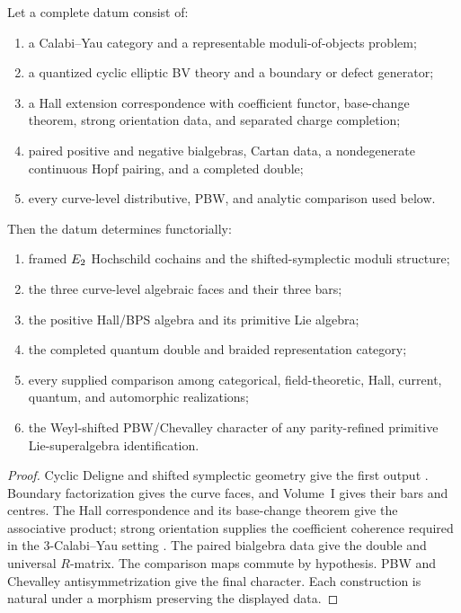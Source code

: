 \begin{theorem}
Let a complete datum consist of:
\begin{enumerate}
\item a Calabi--Yau category and a representable moduli-of-objects problem;
\item a quantized cyclic elliptic BV theory and a boundary or defect generator;
\item a Hall extension correspondence with coefficient functor, base-change theorem, strong orientation data, and separated charge completion;
\item paired positive and negative bialgebras, Cartan data, a nondegenerate continuous Hopf pairing, and a completed double;
\item every curve-level distributive, PBW, and analytic comparison used below.
\end{enumerate}
Then the datum determines functorially:
\begin{enumerate}
\item framed $E_2$ Hochschild cochains and the shifted-symplectic moduli structure;
\item the three curve-level algebraic faces and their three bars;
\item the positive Hall/BPS algebra and its primitive Lie algebra;
\item the completed quantum double and braided representation category;
\item every supplied comparison among categorical, field-theoretic, Hall, current, quantum, and automorphic realizations;
\item the Weyl-shifted PBW/Chevalley character of any parity-refined primitive Lie-superalgebra identification.
\end{enumerate}
\end{theorem}
\begin{proof}
Cyclic Deligne and shifted symplectic geometry give the first output \cite{BravRozenblyum,PTVV,BravDyckerhoff}.  Boundary factorization gives the curve faces, and Volume~I gives their bars and centres.  The Hall correspondence and its base-change theorem give the associative product; strong orientation supplies the coefficient coherence required in the $3$-Calabi--Yau setting \cite{KPS}.  The paired bialgebra data give the double and universal $R$-matrix.  The comparison maps commute by hypothesis.  PBW and Chevalley antisymmetrization give the final character.  Each construction is natural under a morphism preserving the displayed data.
\end{proof}

